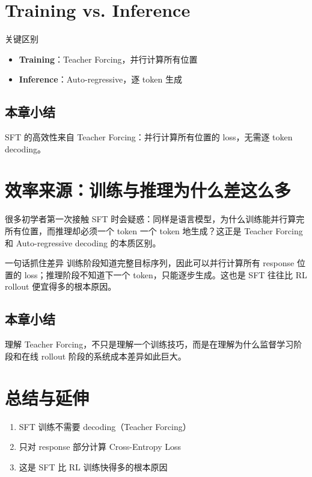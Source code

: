 \documentclass[a4paper]{article}
\begin{document}
\section{Training vs. Inference}
\begin{warningbox}{关键区别}
\begin{itemize}
  \item \textbf{Training}：Teacher Forcing，并行计算所有位置
  \item \textbf{Inference}：Auto-regressive，逐 token 生成
\end{itemize}
\end{warningbox}

\subsection{本章小结}
SFT 的高效性来自 Teacher Forcing：并行计算所有位置的 loss，无需逐 token decoding。

\newpage
\section{效率来源：训练与推理为什么差这么多}
很多初学者第一次接触 SFT 时会疑惑：同样是语言模型，为什么训练能并行算完所有位置，而推理却必须一个 token 一个 token 地生成？这正是 Teacher Forcing 和 Auto-regressive decoding 的本质区别。

\begin{importantbox}{一句话抓住差异}
训练阶段知道完整目标序列，因此可以并行计算所有 response 位置的 loss；推理阶段不知道下一个 token，只能逐步生成。这也是 SFT 往往比 RL rollout 便宜得多的根本原因。
\end{importantbox}

\subsection{本章小结}
理解 Teacher Forcing，不只是理解一个训练技巧，而是在理解为什么监督学习阶段和在线 rollout 阶段的系统成本差异如此巨大。

\newpage
\section{总结与延伸}
\begin{enumerate}
  \item SFT 训练不需要 decoding（Teacher Forcing）
  \item 只对 response 部分计算 Cross-Entropy Loss
  \item 这是 SFT 比 RL 训练快得多的根本原因
\end{enumerate}
\end{document}
